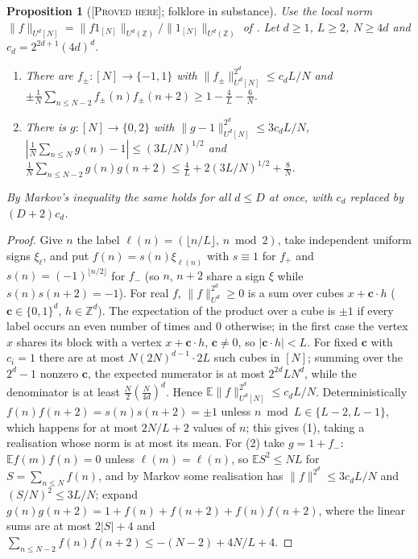 \documentclass[11pt]{amsart}
\newtheorem{proposition}[theorem]{Proposition}
\theoremstyle{definition}
\theoremstyle{remark}
\newcommand{\lbl}[1]{\textup{\textsc{[#1]}}}
\begin{document}
\begin{proposition}[\lbl{Proved here}; folklore in substance]\label{prop:gowers-blind}
Use the local norm $\|f\|_{U^d[N]}=\|f1_{[N]}\|_{U^d(\mathbb Z)}/\|1_{[N]}\|_{U^d(\mathbb Z)}$
of \cite[p.~4]{Tao16b}. Let $d\ge1$, $L\ge2$, $N\ge4d$ and $c_d=2^{2d+1}(4d)^d$.
\begin{enumerate}
\item There are $f_\pm:[N]\to\{-1,1\}$ with $\|f_\pm\|_{U^d[N]}^{2^d}\le c_dL/N$ and
  $\pm\frac1N\sum_{n\le N-2}f_\pm(n)f_\pm(n+2)\ge1-\frac4L-\frac6N$.
\item There is $g:[N]\to\{0,2\}$ with $\|g-1\|_{U^d[N]}^{2^d}\le3c_dL/N$,
  $\left|\frac1N\sum_{n\le N}g(n)-1\right|\le(3L/N)^{1/2}$ and
  $\frac1N\sum_{n\le N-2}g(n)g(n+2)\le\frac4L+2(3L/N)^{1/2}+\frac8N$.
\end{enumerate}
By Markov's inequality the same holds for all $d\le D$ at once, with $c_d$
replaced by $(D+2)c_d$.
\end{proposition}

\begin{proof}
Give $n$ the label $\ell(n)=(\lfloor n/L\rfloor,\,n\bmod 2)$, take independent
uniform signs $\xi_\ell$, and put $f(n)=s(n)\xi_{\ell(n)}$ with $s\equiv1$ for
$f_+$ and $s(n)=(-1)^{\lfloor n/2\rfloor}$ for $f_-$ (so $n$, $n+2$ share a sign
$\xi$ while $s(n)s(n+2)=-1$). For real $f$, $\|f\|_{U^d}^{2^d}\ge0$ is a sum over
cubes $x+\mathbf c\cdot h$ ($\mathbf c\in\{0,1\}^d$, $h\in\mathbb Z^d$). The
expectation of the product over a cube is $\pm1$ if every label occurs an even
number of times and $0$ otherwise; in the first case the vertex $x$ shares its
block with a vertex $x+\mathbf c\cdot h$, $\mathbf c\ne0$, so $|\mathbf c\cdot h|<L$.
For fixed $\mathbf c$ with $c_i=1$ there are at most $N(2N)^{d-1}\cdot2L$ such
cubes in $[N]$; summing over the $2^d-1$ nonzero $\mathbf c$, the expected
numerator is at most $2^{2d}LN^d$, while the denominator is at least
$\frac N2(\frac N{4d})^d$. Hence $\mathbb E\|f\|_{U^d[N]}^{2^d}\le c_dL/N$.
Deterministically $f(n)f(n+2)=s(n)s(n+2)=\pm1$ unless $n\bmod L\in\{L-2,L-1\}$,
which happens for at most $2N/L+2$ values of $n$; this gives (1), taking a
realisation whose norm is at most its mean. For (2) take $g=1+f_-$: $\mathbb E
f(m)f(n)=0$ unless $\ell(m)=\ell(n)$, so $\mathbb ES^2\le NL$ for
$S=\sum_{n\le N}f(n)$, and by Markov some realisation has
$\|f\|^{2^d}\le3c_dL/N$ and $(S/N)^2\le3L/N$; expand
$g(n)g(n+2)=1+f(n)+f(n+2)+f(n)f(n+2)$, where the linear sums are at most $2|S|+4$
and $\sum_{n\le N-2}f(n)f(n+2)\le-(N-2)+4N/L+4$.
\end{proof}
\end{document}
